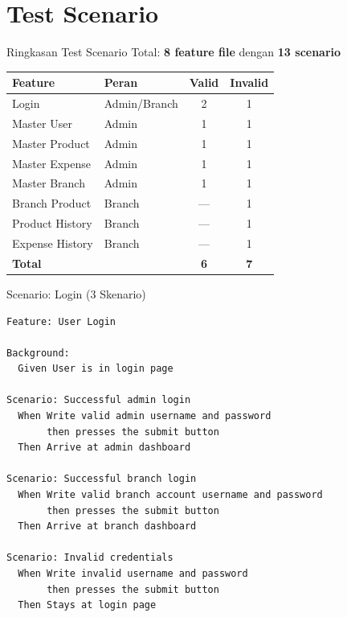 \documentclass[aspectratio=169]{beamer}
\begin{document}
\section{Test Scenario}

\begin{frame}{Ringkasan Test Scenario}
  Total: \textbf{8 feature file} dengan \textbf{13 scenario}

  \begin{table}[h]
    \centering\small
    \begin{tabular}{llcc}
      \toprule
      \textbf{Feature} & \textbf{Peran} & \textbf{Valid} & \textbf{Invalid} \\
      \midrule
      Login            & Admin/Branch & 2 & 1 \\
      Master User      & Admin        & 1 & 1 \\
      Master Product   & Admin        & 1 & 1 \\
      Master Expense   & Admin        & 1 & 1 \\
      Master Branch    & Admin        & 1 & 1 \\
      Branch Product   & Branch       & — & 1 \\
      Product History  & Branch       & — & 1 \\
      Expense History  & Branch       & — & 1 \\
      \midrule
      \textbf{Total}   &              & \textbf{6} & \textbf{7} \\
      \bottomrule
    \end{tabular}
  \end{table}
\end{frame}

\begin{frame}[fragile]{Scenario: Login (3 Skenario)}
\begin{lstlisting}[language={},title={login.feature}]
Feature: User Login

Background:
  Given User is in login page

Scenario: Successful admin login
  When Write valid admin username and password
       then presses the submit button
  Then Arrive at admin dashboard

Scenario: Successful branch login
  When Write valid branch account username and password
       then presses the submit button
  Then Arrive at branch dashboard

Scenario: Invalid credentials
  When Write invalid username and password
       then presses the submit button
  Then Stays at login page
\end{lstlisting}
\end{frame}
\end{document}
